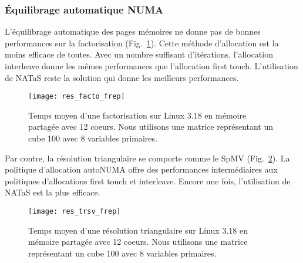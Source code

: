 \subsubsection{\'Equilibrage automatique NUMA}

L'équilibrage automatique des pages mémoires ne donne pas de bonnes performances sur la factorisation (Fig.~\ref{fig:res_facto_frep}).
%
Cette méthode d'allocation est la moins efficace de toutes.
%
Avec un nombre suffisant d'itérations, l'allocation interleave donne les mêmes performances que l'allocation first touch.
%
L'utilisation de NATaS reste la solution qui donne les meilleurs performances.


\begin{figure}
  \centering
  \texttt{[image: res\_facto\_frep]}
  \caption{Temps moyen d'une factorisation sur Linux 3.18 en mémoire partagée avec 12 coeurs. Nous utilisons une matrice représentant un cube 100 avec 8 variables primaires.}
  \label{fig:res_facto_frep}
\end{figure}

Par contre, la résolution triangulaire se comporte comme le SpMV (Fig.~\ref{fig:res_trsv_frep}).
%
La politique d'allocation autoNUMA offre des performances intermédiaires aux politiques d'allocations first touch et interleave.
%
Encore une fois, l'utilisation de NATaS est la plus efficace.


\begin{figure}
  \centering
  \texttt{[image: res\_trsv\_frep]}
  \caption{Temps moyen d'une résolution triangulaire sur Linux 3.18 en mémoire partagée avec 12 coeurs. Nous utilisons une matrice représentant un cube 100 avec 8 variables primaires.}
  \label{fig:res_trsv_frep}
\end{figure}
